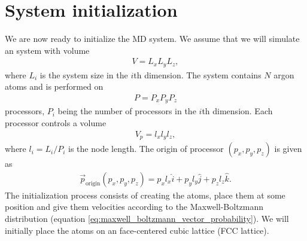 \section{System initialization}
\label{sec:md_system_init}
We are now ready to initialize the MD system. We assume that we will simulate an system with volume 
\begin{align}
	V=L_xL_yL_z,
\end{align}
where $L_i$ is the system size in the $i$th dimension. The system contains $N$ argon atoms and is performed on
\begin{align}
	P = P_xP_yP_z 
\end{align}
processors, $P_i$ being the number of processors in the $i$th dimension. Each processor controls a volume 
\begin{align}
	V_p = l_xl_yl_z,
\end{align}
where $l_i = L_i/P_i$ is the node length. The origin of processor $(p_x, p_y, p_z)$ is given as
\begin{align}
 	\vec p_\text{origin}(p_x, p_y, p_z) = p_xl_x\hat i + p_yl_y\hat j + p_zl_z \hat k.
\end{align}
The initialization process consists of creating the atoms, place them at some position and give them velocities according to the Maxwell-Boltzmann distribution (equation \eqref{eq:maxwell_boltzmann_vector_probability}). We will initially place the atoms on an face-centered cubic lattice (FCC lattice).
